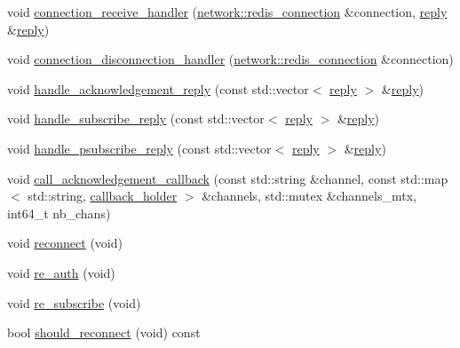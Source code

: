 \begin{DoxyCompactItemize}
\item 
void \hyperlink{classcpp__redis_1_1subscriber_ad37cdd903672a0daa395cc3624c50ecb}{connection\+\_\+receive\+\_\+handler} (\hyperlink{classcpp__redis_1_1network_1_1redis__connection}{network\+::redis\+\_\+connection} \&connection, \hyperlink{classcpp__redis_1_1reply}{reply} \&\hyperlink{classcpp__redis_1_1reply}{reply})
\item 
void \hyperlink{classcpp__redis_1_1subscriber_a344918efce6fc6f628e13c8eceeade3a}{connection\+\_\+disconnection\+\_\+handler} (\hyperlink{classcpp__redis_1_1network_1_1redis__connection}{network\+::redis\+\_\+connection} \&connection)
\item 
void \hyperlink{classcpp__redis_1_1subscriber_ade918ef2347138492fe213450f27bcfd}{handle\+\_\+acknowledgement\+\_\+reply} (const std\+::vector$<$ \hyperlink{classcpp__redis_1_1reply}{reply} $>$ \&\hyperlink{classcpp__redis_1_1reply}{reply})
\item 
void \hyperlink{classcpp__redis_1_1subscriber_a9b8e9e1dc12493703c02f2c832bd20d9}{handle\+\_\+subscribe\+\_\+reply} (const std\+::vector$<$ \hyperlink{classcpp__redis_1_1reply}{reply} $>$ \&\hyperlink{classcpp__redis_1_1reply}{reply})
\item 
void \hyperlink{classcpp__redis_1_1subscriber_a6e67df5af6170ad55e77082f18f63d76}{handle\+\_\+psubscribe\+\_\+reply} (const std\+::vector$<$ \hyperlink{classcpp__redis_1_1reply}{reply} $>$ \&\hyperlink{classcpp__redis_1_1reply}{reply})
\item 
void \hyperlink{classcpp__redis_1_1subscriber_a8cbe2790b1e0f803f41a403ed8c66513}{call\+\_\+acknowledgement\+\_\+callback} (const std\+::string \&channel, const std\+::map$<$ std\+::string, \hyperlink{structcpp__redis_1_1subscriber_1_1callback__holder}{callback\+\_\+holder} $>$ \&channels, std\+::mutex \&channels\+\_\+mtx, int64\+\_\+t nb\+\_\+chans)
\item 
void \hyperlink{classcpp__redis_1_1subscriber_a0d5c27ee74e5422d07ce14677ae0e23b}{reconnect} (void)
\item 
void \hyperlink{classcpp__redis_1_1subscriber_acb33b48b9dfa03b4a5b60cc832b57259}{re\+\_\+auth} (void)
\item 
void \hyperlink{classcpp__redis_1_1subscriber_ac38ffc11fb8e67159a7ffa924a6bb8a6}{re\+\_\+subscribe} (void)
\item 
bool \hyperlink{classcpp__redis_1_1subscriber_a87b9daaeed9872a0bc65438729b1211e}{should\+\_\+reconnect} (void) const
\item 

\end{DoxyCompactItemize}
